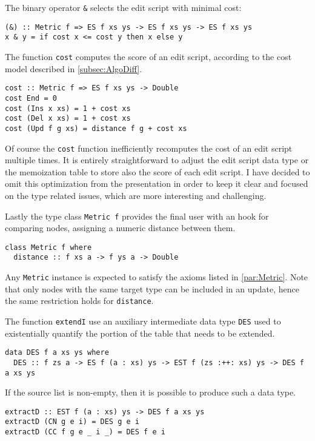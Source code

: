 \documentclass[../Thesis.tex]{subfiles}
\begin{document}
	The binary operator \texttt{\&} selects the edit script with minimal cost:

\begin{verbatim}
(&) :: Metric f => ES f xs ys -> ES f xs ys -> ES f xs ys
x & y = if cost x <= cost y then x else y
\end{verbatim}

	The function \texttt{cost} computes the score of an edit script,
	according to the cost model described in \ref{subsec:AlgoDiff}.

\begin{verbatim}
cost :: Metric f => ES f xs ys -> Double	
cost End = 0
cost (Ins x xs) = 1 + cost xs
cost (Del x xs) = 1 + cost xs
cost (Upd f g xs) = distance f g + cost xs
\end{verbatim}

	Of course the \texttt{cost} function inefficiently recomputes the cost of an 
	edit script multiple times.
	It is entirely straightforward to adjust the edit script data type or the 
	memoization table to store also the score of each edit script.
	I have decided to omit this optimization from the presentation in order
	to keep it clear	and focused on the type related issues, which are 
	more interesting and challenging.
	
	Lastly the type class \texttt{Metric f} provides the final user with 
	an hook for comparing nodes, assigning a numeric distance between them.
\begin{verbatim}
class Metric f where
  distance :: f xs a -> f ys a -> Double
\end{verbatim}
	Any \texttt{Metric} instance is expected to satisfy the axioms listed 
	in \ref{par:Metric}. Note that only nodes with the same target type
	can be included in an update, hence the same restriction holds
	for \texttt{distance}.
	
	The function \texttt{extendI} use an auxiliary intermediate 
	data type \texttt{DES} used to existentially quantify the portion of the table
	that needs to be extended.
	
\begin{verbatim}
data DES f a xs ys where
  DES :: f zs a -> ES f (a : xs) ys -> EST f (zs :++: xs) ys -> DES f a xs ys
\end{verbatim}

	If the source list is non-empty, then it is possible to produce such a
	data type.

\begin{verbatim}
extractD :: EST f (a : xs) ys -> DES f a xs ys
extractD (CN g e i) = DES g e i
extractD (CC f g e _ i _) = DES f e i
\end{verbatim}
\end{document}
